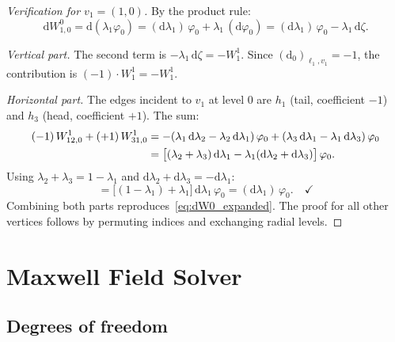 \documentclass[11pt,a4paper]{article}
\newcommand{\dd}{\mathrm{d}}
\begin{document}
\begin{proof}[Verification for $v_1 = (1,0)$]
By the product rule:
\begin{equation}
  \dd W^0_{1,0} = \dd(\lambda_1 \varphi_0)
    = (\dd\lambda_1)\,\varphi_0 + \lambda_1\,(\dd\varphi_0)
    = (\dd\lambda_1)\,\varphi_0 - \lambda_1\,\dd\zeta.
  \label{eq:dW0_expanded}
\end{equation}

\emph{Vertical part.} The second term is $-\lambda_1\,\dd\zeta = -W^1_1$.
Since $(\dd_0)_{\ell_1, v_1} = -1$, the contribution is
$(-1)\cdot W^1_1 = -W^1_1$. \checkmark

\emph{Horizontal part.} The edges incident to $v_1$ at level 0 are $h_1$
(tail, coefficient $-1$) and $h_3$ (head, coefficient $+1$). The sum:
\begin{align}
  (-1)\,W^1_{12,0} + (+1)\,W^1_{31,0}
  &= -(\lambda_1\,\dd\lambda_2 - \lambda_2\,\dd\lambda_1)\,\varphi_0
    + (\lambda_3\,\dd\lambda_1 - \lambda_1\,\dd\lambda_3)\,\varphi_0 \notag\\
  &= \bigl[(\lambda_2 + \lambda_3)\,\dd\lambda_1
    - \lambda_1(\dd\lambda_2 + \dd\lambda_3)\bigr]\,\varphi_0.
\end{align}
Using $\lambda_2 + \lambda_3 = 1 - \lambda_1$ and
$\dd\lambda_2 + \dd\lambda_3 = -\dd\lambda_1$:
\begin{equation}
  = \bigl[(1 - \lambda_1) + \lambda_1\bigr]\,\dd\lambda_1\,\varphi_0
  = (\dd\lambda_1)\,\varphi_0. \quad\checkmark
\end{equation}
Combining both parts reproduces~\eqref{eq:dW0_expanded}. The proof for all
other vertices follows by permuting indices and exchanging radial levels.
\end{proof}

\section{Maxwell Field Solver}
\label{sec:maxwell}

\subsection{Degrees of freedom}
\label{sec:dof}
\end{document}
